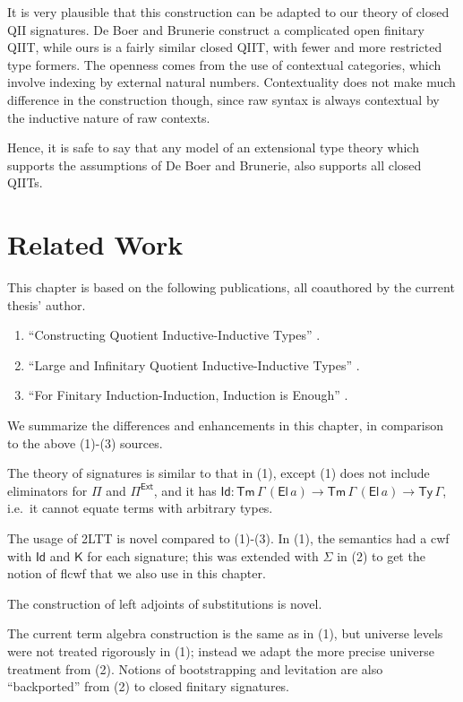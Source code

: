 \documentclass[12pt,a4paper,twoside,openany]{book}
\theoremstyle{remark}
\theoremstyle{definition}
\theoremstyle{theorem}
\newcommand{\Tm}{\mathsf{Tm}}
\newcommand{\Ty}{\mathsf{Ty}}
\newcommand{\El}{\mathsf{El}}
\newcommand{\Id}{\mathsf{Id}}
\newcommand{\Pie}{\Pi^{\mathsf{Ext}}}
\newcommand{\K}{\mathsf{K}}
\begin{document}
It is very plausible that this construction can be adapted to our theory of
closed QII signatures. De Boer and Brunerie construct a complicated open
finitary QIIT, while ours is a fairly similar closed QIIT, with fewer and more
restricted type formers. The openness comes from the use of contextual
categories, which involve indexing by external natural numbers. Contextuality
does not make much difference in the construction though, since raw syntax is
always contextual by the inductive nature of raw contexts.

Hence, it is safe to say that any model of an extensional type theory which
supports the assumptions of De Boer and Brunerie, also supports all closed
QIITs.

\section{Related Work}
\label{sec:fqii-related-work}

This chapter is based on the following publications, all coauthored by the
current thesis' author.
\begin{enumerate}
  \item ``Constructing Quotient Inductive-Inductive Types'' \cite{kaposi2019constructing}.
  \item ``Large and Infinitary Quotient Inductive-Inductive Types'' \cite{iqiit}.
  \item ``For Finitary Induction-Induction, Induction is Enough'' \cite{ind-ind-reduction}.
\end{enumerate}
We summarize the differences and enhancements in this chapter, in comparison to the above
(1)-(3) sources.

The theory of signatures is similar to that in (1), except (1) does not include
eliminators for $\Pi$ and $\Pie$, and it has $\Id : \Tm\,\Gamma\,(\El\,a) \to
\Tm\,\Gamma\,(\El\,a) \to \Ty\,\Gamma$, i.e.\ it cannot equate terms with arbitrary
types.

The usage of 2LTT is novel compared to (1)-(3). In (1), the semantics had a cwf
with $\Id$ and $\K$ for each signature; this was extended with $\Sigma$ in (2)
to get the notion of flcwf that we also use in this chapter.

The construction of left adjoints of substitutions is novel.

The current term algebra construction is the same as in (1), but universe levels
were not treated rigorously in (1); instead we adapt the more precise universe
treatment from (2). Notions of bootstrapping and levitation are also
``backported'' from (2) to closed finitary signatures.
\end{document}
